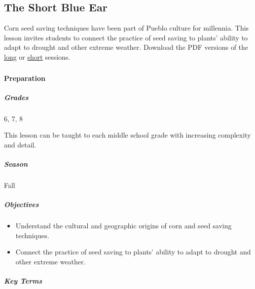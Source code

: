 \documentclass[12pt,]{article}
\providecommand{\tightlist}{%
  \setlength{\itemsep}{0pt}\setlength{\parskip}{0pt}}
\let\oldparagraph\paragraph
\renewcommand{\paragraph}[1]{\oldparagraph{#1}\mbox{}}
\let\oldsubparagraph\subparagraph
\renewcommand{\subparagraph}[1]{\oldsubparagraph{#1}\mbox{}}
\begin{document}
\hypertarget{the-short-blue-ear}{%
\subsection{The Short Blue Ear}\label{the-short-blue-ear}}

Corn seed saving techniques have been part of Pueblo culture for millennia. This lesson invites students to connect the practice of seed saving to plants' ability to adapt to drought and other extreme weather. Download the PDF versions of the \href{./lessons/PFP_Lesson-5_The-Short-Blue-Ear_Long.pdf}{long} or \href{./lessons/PFP_Lesson-5_The-Short-Blue-Ear_Short.pdf}{short} sessions.

\hypertarget{section-4}{%
\subsubsection*{}\label{section-4}}

\hypertarget{preparation-4}{%
\paragraph{Preparation}\label{preparation-4}}

\hypertarget{grades-1}{%
\subparagraph{Grades}\label{grades-1}}

6, 7, 8

This lesson can be taught to each middle school grade with increasing
complexity and detail.

\hypertarget{season-2}{%
\subparagraph{Season}\label{season-2}}

Fall

\hypertarget{objectives-2}{%
\subparagraph{Objectives}\label{objectives-2}}

\begin{itemize}
\tightlist
\item
  Understand the cultural and geographic origins of corn and seed saving techniques.
\item
  Connect the practice of seed saving to plants' ability to adapt to drought and other extreme weather.
\end{itemize}

\hypertarget{key-terms-2}{%
\subparagraph{Key Terms}\label{key-terms-2}}
\end{document}
